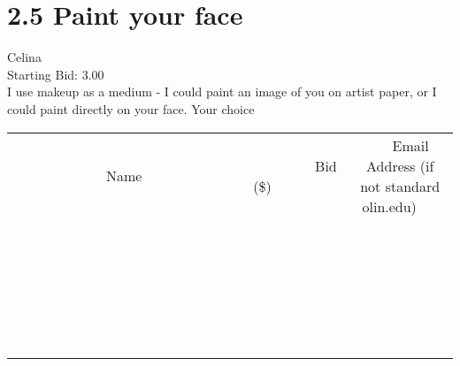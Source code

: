 \documentclass[11pt]{article}
\begin{document}
					\section*{2.5 Paint your face}
					Celina \\
					Starting Bid: 3.00 \\
					I use makeup as a medium - I could paint an image of you on artist paper, or I could paint directly on your face. Your choice \\
					[6ex]
					\begin{tabular}{c c c}
						~~~~~~~~~~~~~Name~~~~~~~~~~~~~ & ~~~~~~~~~Bid (\$)~~~~~~~~~ & ~~~Email Address (if not standard olin.edu)~~~ \\
				
 & & \\
\hline
 & & \\
\hline
 & & \\
\hline
 & & \\
\hline
 & & \\
\hline
 & & \\
\hline
 & & \\
\hline
 & & \\
\hline
 & & \\
\hline
 & & \\
\hline
 & & \\
\hline
 & & \\
\hline
 & & \\
\hline
 & & \\
\hline
 & & \\
\hline
 & & \\
\hline
 & & \\
\hline
 & & \\
\hline
 & & \\
\hline
 & & \\
\hline
 & & \\
\hline
 & & \\
\hline
 & & \\
\hline
 & & \\
\hline
 & & \\
\hline
 & & \\
\hline
					\end{tabular}
					\clearpage
				
\end{document}

